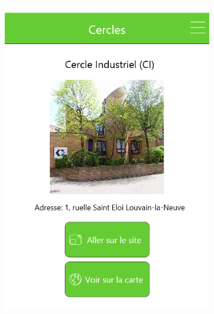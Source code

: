 \documentclass{eplmastersthesis}
\begin{document}
\begin{figure}[H]
\begin{subfigure}[b]{0.3\textwidth}
        \includegraphics[width=\textwidth]{Images/InVision/cercledetail.png}
    \end{subfigure}
\end{figure}
\end{document}
